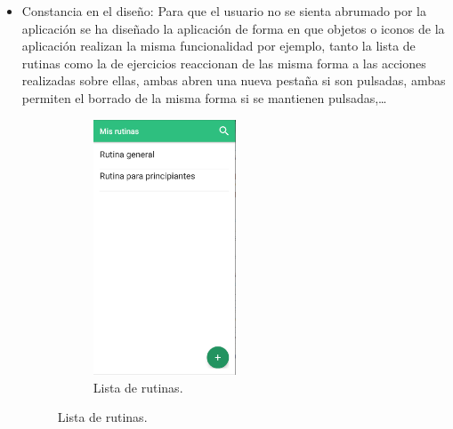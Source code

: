 \documentclass[11pt,a4paper]{report}
\begin{document}
\begin{itemize}
	\item Constancia en el diseño: Para que el usuario no se sienta abrumado por la aplicación se ha diseñado la aplicación de forma en que objetos o iconos de la aplicación realizan la misma funcionalidad por ejemplo, tanto la lista de rutinas como la de ejercicios reaccionan de las misma forma a las acciones realizadas sobre ellas, ambas abren una nueva pestaña si son pulsadas, ambas permiten el borrado de la misma forma si se mantienen pulsadas,…
	\begin{figure}[H]
		\begin{minipage}[b]{0.5\linewidth} %
			\begin{figure}[H]
				\centering
				\includegraphics[width=0.5\textwidth]{graficos/Usabilidad/Lista1.png}
				\caption{Lista de rutinas.}
			\end{figure}


\end{minipage}
\end{figure}
\end{itemize}
\end{document}
